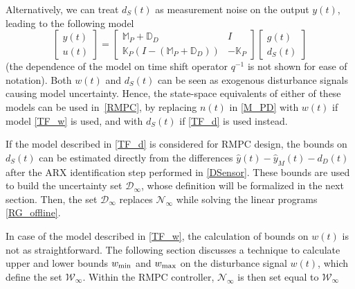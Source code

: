 \documentclass[letterpaper, 10 pt, conference]{ieeeconf}  %
\begin{document}
	Alternatively, we can treat $d_S(t)$ as measurement noise on the output $y(t)$, leading to the following model
	\begin{equation}
	\begin{bmatrix}
	y(t) \\ u(t)
	\end{bmatrix} = 
	\begin{bmatrix} 
	\mathbb{M}_P+\mathbb{D}_D & I \\
	\mathbb{K}_P(I-(\mathbb{M}_P+\mathbb{D}_D)) &  -\mathbb{K}_P
	\end{bmatrix}
	\begin{bmatrix}
	g(t) \\ d_S(t)
	\end{bmatrix}
	\label{TF_d}
	\end{equation} 
(the dependence of the model on time shift operator $q^{-1}$ is not shown for ease of notation). Both $w(t)$ and $d_S(t)$ can be seen as exogenous disturbance signals causing model uncertainty. Hence, the state-space equivalents of either of these models can be used in~\eqref{RMPC}, by replacing $n(t)$ in \eqref{M_PD} with $w(t)$ if model \eqref{TF_w} is used, and with $d_S(t)$ if \eqref{TF_d} is used instead.

If the model described in \eqref{TF_d} is considered for RMPC design, the bounds on $d_S(t)$ can be estimated directly from the differences $\hat y(t)-\hat y_M(t)-d_D(t)$ after the
ARX identification step performed in \eqref{DSensor}. These bounds are used to build the uncertainty set $\mathcal{D}_{\infty}$, whose definition will be formalized in the next section. Then, the set $\mathcal{D}_{\infty}$ replaces $\mathcal{N}_{\infty}$ while solving the linear programs \eqref{RG_offline}. 

In case of the model described in \eqref{TF_w}, the calculation of bounds on $w(t)$ is not as straightforward. The following section discusses a technique to calculate upper and lower bounds $w_{\rm min}$ and $w_{\rm max}$ on the disturbance signal $w(t)$, which define the set $\mathcal{W}_{\infty}$. Within the RMPC controller, $\mathcal{N}_{\infty}$ is then set equal to $\mathcal{W}_{\infty}$
\end{document}
